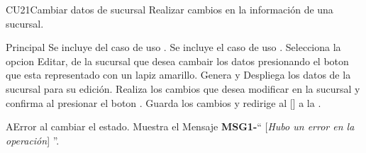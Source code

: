 \begin{UseCase}{CU21}{Cambiar datos de sucursal}{
		Realizar cambios en la información de una sucursal.
	}
	\end{UseCase}




	\begin{UCtrayectoria}{Principal}
		\UCpaso Se incluye del caso de uso .
		\UCpaso Se incluye el caso de uso .
		\UCpaso[\UCactor] Selecciona la opcion Editar, de la sucursal que desea cambair los datos presionando el boton  que esta representado con un lapiz amarillo.
		\UCpaso Genera y Despliega los datos de la sucursal para su edición. 
		\UCpaso[\UCactor] Realiza los cambios que desea modificar en la sucursal y confirma al presionar el boton . 
		\UCpaso Guarda los cambios y redirige al [\UCactor] a la  .
	\end{UCtrayectoria}




\begin{UCtrayectoriaA}{A}{Error al cambiar el estado.}
			\UCpaso Muestra el Mensaje {\bf MSG1-}`` [{\em Hubo un error en la operación}] ''.
			
		\end{UCtrayectoriaA}


